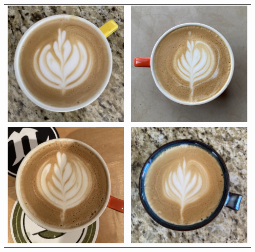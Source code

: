 \begin{center}
  \setlength{\tabcolsep}{10pt}
  \renewcommand{\arraystretch}{3.3}
  \begin{tabular}{cc}
    \includegraphics[width=6cm]{img/latte-06-26.jpg} &
    \includegraphics[width=6cm]{img/latte-06-29.jpg} \\
    \includegraphics[width=6cm]{img/latte-07-02.jpg} &
    \includegraphics[width=6cm]{img/latte-07-04.jpg} \\
  \end{tabular}
\end{center}
